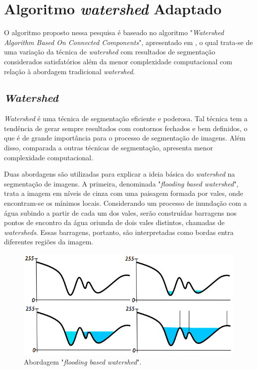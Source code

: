 \chapter{Algoritmo \textit{watershed} Adaptado}\label{cap:algoritmo}

O algoritmo proposto nessa pesquisa é baseado no algoritmo "\textit{Watershed Algorithm Based On Connected Components}", apresentado em \cite{ruparelia2012implementation}, o qual trata-se de uma variação da técnica de \textit{watershed} com resultados de segmentação considerados satisfatórios além da menor complexidade computacional com relação à abordagem tradicional \textit{watershed}.

\section{\textit{Watershed}}\label{sec:watershed}
\textit{Watershed} é uma técnica de segmentação eficiente e poderosa. Tal técnica tem a tendência de gerar sempre resultados com contornos fechados e bem definidos, o que é de grande importância para o processo de segmentação de imagens. Além disso, comparada a outras técnicas de segmentação, apresenta menor complexidade computacional.

Duas abordagens são utilizadas para explicar a ideia básica do \textit{watershed} na segmentação de imagens. 
A primeira, denominada "\textit{flooding based watershed}", trata a imagem em níveis de cinza com uma paisagem formada por vales, onde encontram-se os mínimos locais. Considerando um processo de inundação com a água subindo a partir de cada um dos vales, serão construídas barragens nos pontos de encontro da água oriunda de dois vales distintos, chamadas de \textit{watersheds}. Essas barragens, portanto, são interpretadas como bordas entra diferentes regiões da imagem.\citep{l6} 

	\begin{figure}[!htb]
       \begin{center}  
          \includegraphics[width=0.6\columnwidth]{img/abordagem_flooding.jpg}
           \caption{\label{fig:abordagem_flooding}Abordagem "\textit{flooding based watershed}".\cite{regseg1}}
       \end{center}
   \end{figure} 


